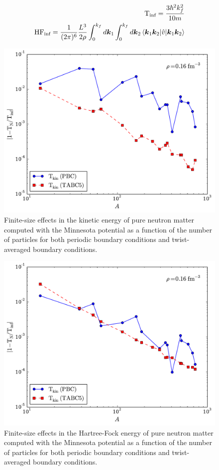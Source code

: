 \begin{align}
  \text{T}_{\text{inf}}=\frac{3\hbar^{2}k_{f}^{2}}{10m} \\
  \text{HF}_{\text{inf}}=\frac{1}{\mathop{(2\pi)^{6}}}\frac{L^{3}}{2\rho}\int_{0}^{k_{f}}d\vec{k}_{1}\int_{0}^{k_{f}}d\vec{k}_{2}\braket{\vec{k}_{1}\vec{k}_{2}|\hat{v}|\vec{k}_{1}\vec{k}_{2}}
\end{align}

\begin{figure}
  \includegraphics[width=\linewidth]{Chapter8-figures/fig3.pdf}
  \caption{Finite-size effects in the kinetic energy of pure neutron matter computed with the Minnesota potential as a function of the number of particles for both periodic boundary conditions and twist-averaged boundary conditions.}
  \label{fig:fig3}
\end{figure}

\begin{figure}
  \includegraphics[width=\linewidth]{Chapter8-figures/fig4.pdf}
  \caption{Finite-size effects in the Hartree-Fock energy of pure neutron matter computed with the Minnesota potential as a function of the number of particles for both periodic boundary conditions and twist-averaged boundary conditions.}
  \label{fig:fig4}
\end{figure}


